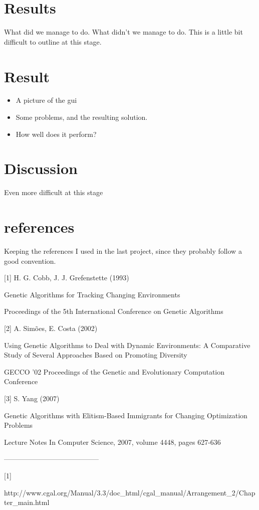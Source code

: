 \documentclass[a4paper,12pt]{article}
\begin{document}
\section{Results}
What did we manage to do. What didn't we manage to do. This is a little bit difficult to outline at this stage.

\section{Result}
\begin{itemize}
\item
A picture of the gui
\item
Some problems, and the resulting solution.
\item
How well does it perform?
\end{itemize}

\section{Discussion}
Even more difficult at this stage


\section{references}
Keeping the references I used in the last project, since they probably follow a good convention.

[1] H. G. Cobb, J. J. Grefenstette (1993)

Genetic Algorithms for Tracking Changing Environments

Proceedings of the 5th International Conference on Genetic Algorithms

[2] A. Simões, E. Costa (2002)

Using Genetic Algorithms to Deal with Dynamic Environments: A Comparative Study of Several Approaches Based on Promoting Diversity

GECCO '02 Proceedings of the Genetic and Evolutionary Computation Conference

[3] S. Yang (2007)

Genetic Algorithms with Elitism-Based Immigrants for Changing Optimization Problems

Lecture Notes In Computer Science, 2007, volume 4448, pages 627-636

-----------------------------------------

[1]

http://www.cgal.org/Manual/3.3/doc\_html/cgal\_manual/Arrangement\_2/Chapter\_main.html
\end{document}
